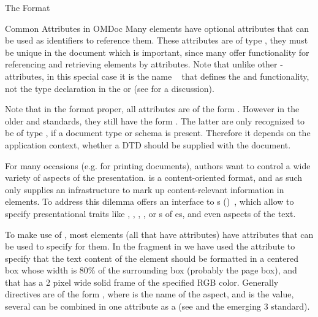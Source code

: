 \begin{omgroup}[creators=miko,id=spec-intro]{The {\omdoc} Format}
\begin{omgroup}[id=common-attribs]{Common Attributes in OMDoc}
Many {\omdoc} elements have optional {} attributes that
can be used as identifiers to reference them. These attributes are of type
, they must be unique in the document which is important,
since many {\xml}  offer functionality for
referencing and retrieving elements by  attributes.
Note that unlike other {}-attributes, in this special case it is the name
{}~\cite{XML:id05} that defines the
{} and {} functionality, not the type
declaration in the {} or {} (see
{} for a discussion).

  Note that in the {\omdoc} format proper, all {} attributes are of the
  form {}. However in the older {\openmath} and {\mathml}
  standards, they still have the form {}. The latter are only
  recognized to be of type {}, if a document type or {\xml}schema is
  present. Therefore it depends on the application context, whether a DTD should be
  supplied with the {\omdoc} document.

  For many occasions (e.g. for printing {\omdoc} documents), authors want to control a
  wide variety of aspects of the presentation. {\omdoc} is a content-oriented format, and
  as such only supplies an infrastructure to mark up content-relevant information in
  {\omdoc} elements. To address this dilemma {\xml} offers an interface to 
  {s} ({\css})~\cite{BosHak:css98}, which allow to specify
  presentational traits like {}, {},
  {}, {}, or {s} of
  {es}, and even {} aspects of the text.

  To make use of {\css}, most {\omdoc} elements (all that have
  {} attributes) have {} attributes
  that can be used to specify {\css}  for them. In the
  {\omdoc} fragment in {} we have used the {}
  attribute to specify that the text content of the {} element should be
  formatted in a centered box whose width is 80\% of the surrounding box (probably the
  page box), and that has a 2 pixel wide solid frame of the specified RGB color. Generally
  {\css} directives are of the form {}, where {} is the name of
  the aspect, and {} is the value, several {\css}
   can be combined in one {}
  attribute as a {} (see {\cite{BosHak:css98} and the
    emerging {\css} 3} standard).


\end{omgroup}
\end{omgroup}
